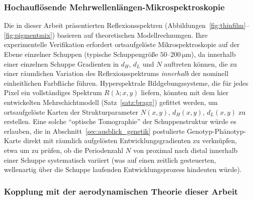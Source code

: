 ﻿\documentclass[a4paper,12pt]{article}
\theoremstyle{definition}
\begin{document}
	\subsubsection{Hochauflösende Mehrwellenlängen-Mikrospektroskopie}

	Die in dieser Arbeit präsentierten Reflexionsspektren
	(Abbildungen~\ref{fig:thinfilm}--\ref{fig:pigmentmix}) basieren auf
	theoretischen Modellrechnungen. Ihre experimentelle Verifikation
	erfordert ortsaufgelöste Mikrospektroskopie auf der Ebene einzelner
	Schuppen (typische Schuppengröße $50$--$200\,\si{\micro\meter}$), da
	innerhalb einer einzelnen Schuppe Gradienten in $d_H$, $d_L$ und $N$
	auftreten können, die zu einer räumlichen Variation des
	Reflexionsspektrums \emph{innerhalb} der nominell einheitlichen
	Farbfläche führen. Hyperspektrale Bildgebungssysteme, die für jedes
	Pixel ein vollständiges Spektrum $R(\lambda;x,y)$ liefern, könnten
	mit dem hier entwickelten Mehrschichtmodell (Satz~\ref{satz:bragg})
	gefittet werden, um ortsaufgelöste Karten der Strukturparameter
	$N(x,y)$, $d_H(x,y)$, $d_L(x,y)$ zu erstellen. Eine solche
	``optische Tomographie'' der Schuppenstruktur würde es erlauben, die
	in Abschnitt~\ref{sec:ausblick_genetik} postulierte
	Genotyp-Phänotyp-Karte direkt mit räumlich aufgelösten
	Entwicklungsgradienten zu verknüpfen, etwa um zu prüfen, ob die
	Periodenzahl $N$ von proximal nach distal innerhalb einer Schuppe
	systematisch variiert (was auf einen zeitlich gesteuerten,
	wellenartig über die Schuppe laufenden Entwicklungsprozess
	hindeuten würde).

	\subsubsection{Kopplung mit der aerodynamischen Theorie dieser Arbeit}
\end{document}

